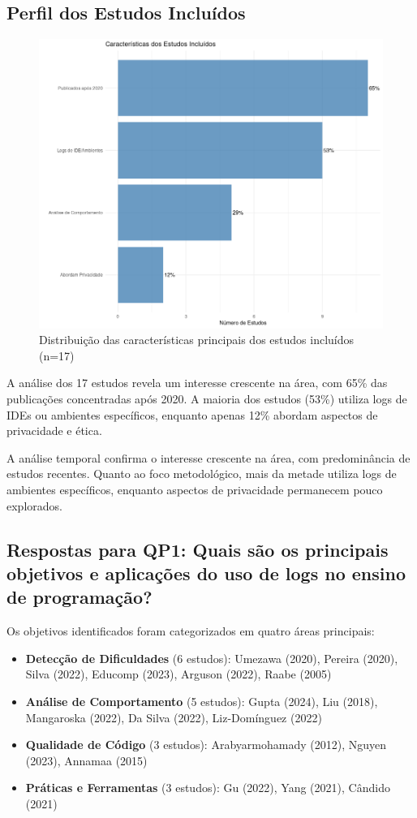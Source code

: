 \subsection{Perfil dos Estudos Incluídos} \label{subsec:perfis}
\begin{figure}
    \centering
    \includegraphics[width=0.75\linewidth]{../figuras/caracteristicas.png}
    \caption{Distribuição das características principais dos estudos incluídos (n=17)}
    \label{fig:placeholder}
\end{figure}

A análise dos 17 estudos revela um interesse crescente na área, com 65\% das publicações concentradas após 2020. A maioria dos estudos (53\%) utiliza logs de IDEs ou ambientes específicos, enquanto apenas 12\% abordam aspectos de privacidade e ética.

A análise temporal confirma o interesse crescente na área, com predominância de estudos recentes. Quanto ao foco metodológico, mais da metade utiliza logs de ambientes específicos, enquanto aspectos de privacidade permanecem pouco explorados.

\subsection{Respostas para QP1: Quais são os principais objetivos e aplicações do uso de logs no ensino de programação?} \label{subsec:respostas-qp1}

Os objetivos identificados foram categorizados em quatro áreas principais:

\begin{itemize}
    \item \textbf{Detecção de Dificuldades} (6 estudos): Umezawa (2020), Pereira (2020), Silva (2022), Educomp (2023), Arguson (2022), Raabe (2005)
    \item \textbf{Análise de Comportamento} (5 estudos): Gupta (2024), Liu (2018), Mangaroska (2022), Da Silva (2022), Liz-Domínguez (2022)
    \item \textbf{Qualidade de Código} (3 estudos): Arabyarmohamady (2012), Nguyen (2023), Annamaa (2015)
    \item \textbf{Práticas e Ferramentas} (3 estudos): Gu (2022), Yang (2021), Cândido (2021)
\end{itemize}

